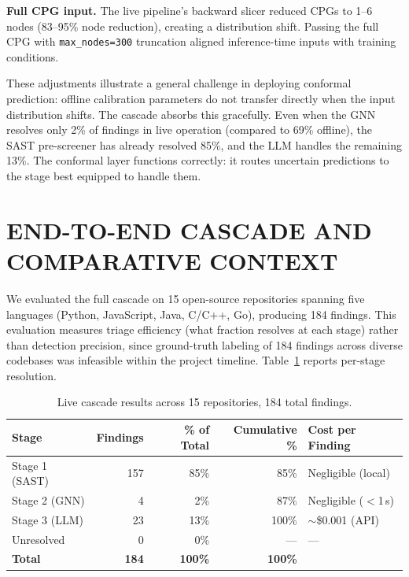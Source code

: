 \textbf{Full CPG input.} The live pipeline's backward slicer reduced CPGs to 1--6 nodes (83--95\% node reduction), creating a distribution shift. Passing the full CPG with \texttt{max\_nodes=300} truncation aligned inference-time inputs with training conditions.

These adjustments illustrate a general challenge in deploying conformal prediction: offline calibration parameters do not transfer directly when the input distribution shifts. The cascade absorbs this gracefully. Even when the GNN resolves only 2\% of findings in live operation (compared to 69\% offline), the SAST pre-screener has already resolved 85\%, and the LLM handles the remaining 13\%. The conformal layer functions correctly: it routes uncertain predictions to the stage best equipped to handle them.

\section{\uppercase{End-to-End Cascade and Comparative Context}}
\label{sec:cascade-eval}

We evaluated the full cascade on 15 open-source repositories spanning five languages (Python, JavaScript, Java, C/C++, Go), producing 184 findings. This evaluation measures triage efficiency (what fraction resolves at each stage) rather than detection precision, since ground-truth labeling of 184 findings across diverse codebases was infeasible within the project timeline. Table~\ref{tab:cascade-results} reports per-stage resolution.

\begin{table}[H]
\centering
\small
\caption{Live cascade results across 15 repositories, 184 total findings.}
\label{tab:cascade-results}
\begin{tabular}{@{}lrrrl@{}}
\toprule
\textbf{Stage} & \textbf{Findings} & \textbf{\% of Total} & \textbf{Cumulative \%} & \textbf{Cost per Finding} \\
\midrule
Stage 1 (SAST) & 157 & 85\% & 85\% & Negligible (local) \\
Stage 2 (GNN) & 4 & 2\% & 87\% & Negligible ($<$1\,s) \\
Stage 3 (LLM) & 23 & 13\% & 100\% & $\sim$\$0.001 (API) \\
Unresolved & 0 & 0\% & --- & --- \\
\midrule
\textbf{Total} & \textbf{184} & \textbf{100\%} & \textbf{100\%} & \\
\bottomrule
\end{tabular}
\end{table}

